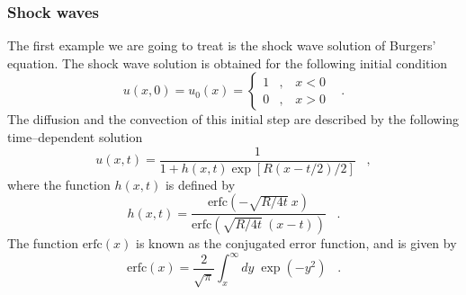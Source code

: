 \subsubsection{Shock waves}
The first example we are going to treat is the shock wave
solution of Burgers'
equation. The shock wave solution is obtained for the following
initial
condition 
\begin{equation}                                             \label{INITSH}
u(x,0) = u_0(x) = \left\{ \begin{array}{rcl}
                        1 & , \;\;\; x < 0 \\
                        0 & , \;\;\; x > 0
                        \end{array} \right. \;\;\; .
\end{equation}
The diffusion and the convection of this initial step are described
by the following time--dependent solution
\begin{equation}
\label{SHOCK}
u(x,t) =
\frac{1}{1+h(x,t) \exp \left[ R \left( x-t/2 \right) /2 \right] }
\;\;\; ,
\end{equation}
where the function $h(x,t)$ is defined by
\begin{equation}
h(x,t) = \frac{ \mbox{erfc} \left( -\sqrt{R/4t} \: x \right)}
   {\mbox{erfc} \left( \sqrt{R/4t} \: \left( x-t \right) \right)}
              \;\;\; .
\end{equation}
The function $\mbox{erfc}(x)$ is known as the conjugated error
function, and
is given by
\begin{equation}
\mbox{erfc}(x) = \frac{2}{\sqrt{\pi}} \int_x^{\infty} dy \;
                   \exp \left(-y^2 \right) \;\;\; .
\end{equation}


